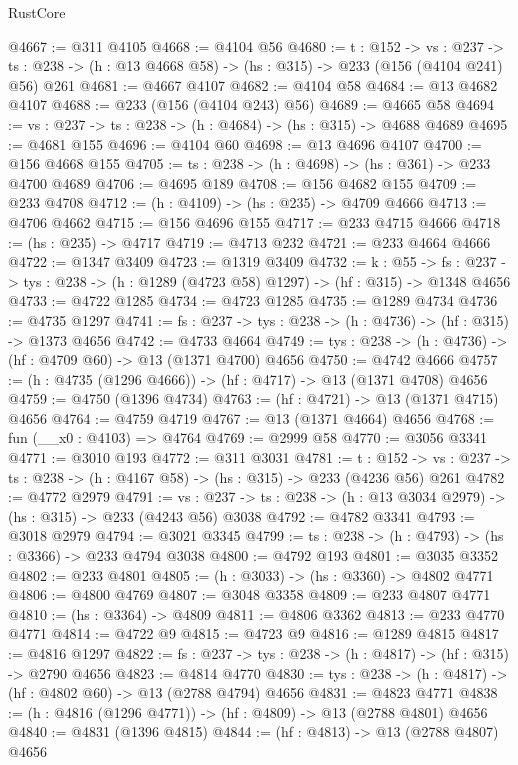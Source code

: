 \begin{lexlean}{RustCore}
\begin{coremodule}
@4667 := @311 @4105
@4668 := @4104 @56
@4680 := {t : @152} ->
  {vs : @237} ->
  {ts : @238} -> (h : @13 @4668 @58) -> (hs : @315) -> @233 (@156 (@4104 @241) @56) @261
@4681 := @4667 @4107
@4682 := @4104 @58
@4684 := @13 @4682 @4107
@4688 := @233 (@156 (@4104 @243) @56)
@4689 := @4665 @58
@4694 := {vs : @237} -> {ts : @238} -> (h : @4684) -> (hs : @315) -> @4688 @4689
@4695 := @4681 @155
@4696 := @4104 @60
@4698 := @13 @4696 @4107
@4700 := @156 @4668 @155
@4705 := {ts : @238} -> (h : @4698) -> (hs : @361) -> @233 @4700 @4689
@4706 := @4695 @189
@4708 := @156 @4682 @155
@4709 := @233 @4708
@4712 := (h : @4109) -> (hs : @235) -> @4709 @4666
@4713 := @4706 @4662
@4715 := @156 @4696 @155
@4717 := @233 @4715 @4666
@4718 := (hs : @235) -> @4717
@4719 := @4713 @232
@4721 := @233 @4664 @4666
@4722 := @1347 @3409
@4723 := @1319 @3409
@4732 := {k : @55} ->
  {fs : @237} -> {tys : @238} -> (h : @1289 (@4723 @58) @1297) -> (hf : @315) -> @1348 @4656
@4733 := @4722 @1285
@4734 := @4723 @1285
@4735 := @1289 @4734
@4736 := @4735 @1297
@4741 := {fs : @237} -> {tys : @238} -> (h : @4736) -> (hf : @315) -> @1373 @4656
@4742 := @4733 @4664
@4749 := {tys : @238} -> (h : @4736) -> (hf : @4709 @60) -> @13 (@1371 @4700) @4656
@4750 := @4742 @4666
@4757 := (h : @4735 (@1296 @4666)) -> (hf : @4717) -> @13 (@1371 @4708) @4656
@4759 := @4750 (@1396 @4734)
@4763 := (hf : @4721) -> @13 (@1371 @4715) @4656
@4764 := @4759 @4719
@4767 := @13 (@1371 @4664) @4656
@4768 := fun (__x0 : @4103) => @4764
@4769 := @2999 @58
@4770 := @3056 @3341
@4771 := @3010 @193
@4772 := @311 @3031
@4781 := {t : @152} ->
  {vs : @237} -> {ts : @238} -> (h : @4167 @58) -> (hs : @315) -> @233 (@4236 @56) @261
@4782 := @4772 @2979
@4791 := {vs : @237} ->
  {ts : @238} -> (h : @13 @3034 @2979) -> (hs : @315) -> @233 (@4243 @56) @3038
@4792 := @4782 @3341
@4793 := @3018 @2979
@4794 := @3021 @3345
@4799 := {ts : @238} -> (h : @4793) -> (hs : @3366) -> @233 @4794 @3038
@4800 := @4792 @193
@4801 := @3035 @3352
@4802 := @233 @4801
@4805 := (h : @3033) -> (hs : @3360) -> @4802 @4771
@4806 := @4800 @4769
@4807 := @3048 @3358
@4809 := @233 @4807 @4771
@4810 := (hs : @3364) -> @4809
@4811 := @4806 @3362
@4813 := @233 @4770 @4771
@4814 := @4722 @9
@4815 := @4723 @9
@4816 := @1289 @4815
@4817 := @4816 @1297
@4822 := {fs : @237} -> {tys : @238} -> (h : @4817) -> (hf : @315) -> @2790 @4656
@4823 := @4814 @4770
@4830 := {tys : @238} -> (h : @4817) -> (hf : @4802 @60) -> @13 (@2788 @4794) @4656
@4831 := @4823 @4771
@4838 := (h : @4816 (@1296 @4771)) -> (hf : @4809) -> @13 (@2788 @4801) @4656
@4840 := @4831 (@1396 @4815)
@4844 := (hf : @4813) -> @13 (@2788 @4807) @4656

\end{coremodule}
\end{lexlean}
